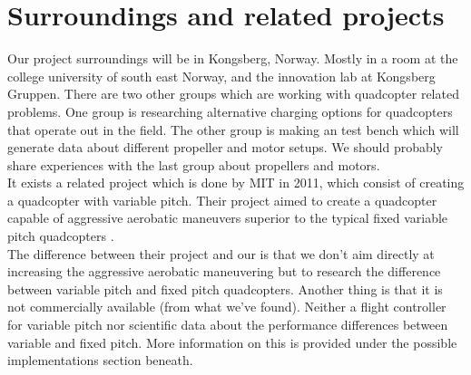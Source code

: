 \section{Surroundings and related projects}

Our project surroundings will be in Kongsberg, Norway. Mostly in a room at the college university of south east Norway, and the innovation lab at Kongsberg Gruppen.
\newline
There are two other groups which are working with quadcopter related problems. One group is researching alternative charging options for quadcopters that operate out in the field. The other group is making an test bench which will generate data about different propeller and motor setups. We should probably share experiences with the last group about propellers and motors.\\
\newline
It exists a related project which is done by MIT in 2011, which consist of creating a quadcopter with variable pitch. Their project aimed to create a quadcopter capable of  aggressive aerobatic maneuvers superior to the typical fixed variable pitch quadcopters \cite{VPQ}. \\
\newline
The difference between their project and our is that we don’t aim directly at increasing the aggressive aerobatic maneuvering but to research the difference between variable pitch and fixed pitch quadcopters.
Another thing is that it is not commercially available (from what we've found).  Neither a flight controller for variable pitch nor scientific data about the performance differences between variable and fixed pitch.
\newline
More information on this is provided under the possible implementations section beneath.